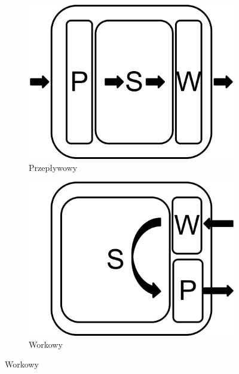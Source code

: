 		\begin{figure}[h]
			\centering
			\begin{subfigure}[b]{0.3\textwidth}
                \centering
                \includegraphics[width=\textwidth]{images/przeplywowy_magazyn}
                \caption{Przepływowy}
                \label{fig:linear_warehouse}
        	\end{subfigure}
        	\quad
			\begin{subfigure}[b]{0.3\textwidth}
                \centering
                \includegraphics[width=\textwidth]{images/workowy_magazyn}
                \caption{Workowy}
                \label{fig:baggy_warehouse}
        	\end{subfigure}

\end{figure}
